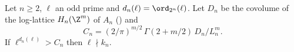 Let $n\ge2$, $\ell$ an odd prime and $d_n(\ell)=\ord_{2^n}(\ell)$. Let $D_n$ be the covolume of the log-lattice $H_n(\Z^m)$ of $A_n$ () and
\[ C_n=(2/\pi)^{m/2}\,\Gamma(2+m/2)\,D_n/L_n^{m}. \]
If $\ell^{d_n(\ell)}>C_n$ then $\ell\nmid k_n$.

